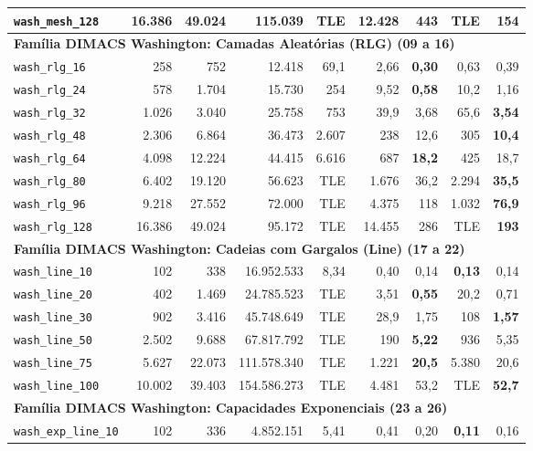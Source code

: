 \documentclass[12pt,a4paper]{article}
\begin{document}
\begin{longtable}{lrrrrrrrr}
\texttt{wash\_mesh\_128} & 16.386 & 49.024 & 115.039 & TLE & 12.428 & 443 & TLE & \textbf{154} \\
\midrule
\multicolumn{9}{l}{\textbf{Família DIMACS Washington: Camadas Aleatórias (RLG) (09 a 16)}} \\
\midrule
\texttt{wash\_rlg\_16} & 258 & 752 & 12.418 & 69,1 & 2,66 & \textbf{0,30} & 0,63 & 0,39 \\
\texttt{wash\_rlg\_24} & 578 & 1.704 & 15.730 & 254 & 9,52 & \textbf{0,58} & 10,2 & 1,16 \\
\texttt{wash\_rlg\_32} & 1.026 & 3.040 & 25.758 & 753 & 39,9 & 3,68 & 65,6 & \textbf{3,54} \\
\texttt{wash\_rlg\_48} & 2.306 & 6.864 & 36.473 & 2.607 & 238 & 12,6 & 305 & \textbf{10,4} \\
\texttt{wash\_rlg\_64} & 4.098 & 12.224 & 44.415 & 6.616 & 687 & \textbf{18,2} & 425 & 18,7 \\
\texttt{wash\_rlg\_80} & 6.402 & 19.120 & 56.623 & TLE & 1.676 & 36,2 & 2.294 & \textbf{35,5} \\
\texttt{wash\_rlg\_96} & 9.218 & 27.552 & 72.000 & TLE & 4.375 & 118 & 1.032 & \textbf{76,9} \\
\texttt{wash\_rlg\_128} & 16.386 & 49.024 & 95.172 & TLE & 14.455 & 286 & TLE & \textbf{193} \\
\midrule
\multicolumn{9}{l}{\textbf{Família DIMACS Washington: Cadeias com Gargalos (Line) (17 a 22)}} \\
\midrule
\texttt{wash\_line\_10} & 102 & 338 & 16.952.533 & 8,34 & 0,40 & 0,14 & \textbf{0,13} & 0,14 \\
\texttt{wash\_line\_20} & 402 & 1.469 & 24.785.523 & TLE & 3,51 & \textbf{0,55} & 20,2 & 0,71 \\
\texttt{wash\_line\_30} & 902 & 3.416 & 45.748.649 & TLE & 28,9 & 1,75 & 108 & \textbf{1,57} \\
\texttt{wash\_line\_50} & 2.502 & 9.688 & 67.817.792 & TLE & 190 & \textbf{5,22} & 936 & 5,35 \\
\texttt{wash\_line\_75} & 5.627 & 22.073 & 111.578.340 & TLE & 1.221 & \textbf{20,5} & 5.380 & 20,6 \\
\texttt{wash\_line\_100} & 10.002 & 39.403 & 154.586.273 & TLE & 4.481 & 53,2 & TLE & \textbf{52,7} \\
\midrule
\multicolumn{9}{l}{\textbf{Família DIMACS Washington: Capacidades Exponenciais (23 a 26)}} \\
\midrule
\texttt{wash\_exp\_line\_10} & 102 & 336 & 4.852.151 & 5,41 & 0,41 & 0,20 & \textbf{0,11} & 0,16 \\

\end{longtable}
\end{document}
